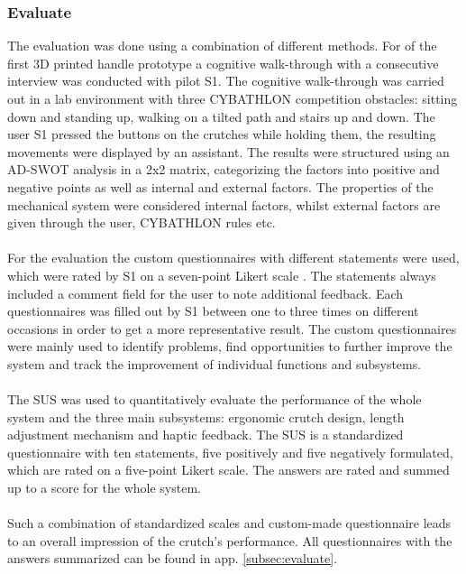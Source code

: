 \documentclass[conference,a4paper]{IEEEtran}
\begin{document}
\subsubsection{Evaluate}
The evaluation was done using a combination of different methods. For of the first 3D printed handle prototype a cognitive walk-through with a consecutive interview was conducted with pilot S1. The cognitive walk-through was carried out in a lab environment with three CYBATHLON competition obstacles: sitting down and standing up, walking on a tilted path and stairs up and down. The user S1 pressed the buttons on the crutches while holding them, the resulting movements were displayed by an assistant. The results were structured using an AD-SWOT analysis \cite{wu2009ucd} in a 2x2 matrix, categorizing the factors into positive and negative points as well as internal and external factors. The properties of the mechanical system were considered internal factors, whilst external factors are given through the user, CYBATHLON rules etc.\\
\\
For the evaluation the custom questionnaires with different statements were used, which were rated by S1 on a seven-point Likert scale \cite{likert}. The statements always included a comment field for the user to note additional feedback. Each questionnaires was filled out by S1 between one to three times on different occasions in order to get a more representative result. The custom questionnaires were mainly used to identify problems, find opportunities to further improve the system and track the improvement of individual functions and subsystems.\\
\\
The SUS \cite{brooke1996sus} was used to quantitatively evaluate the performance of the whole system and the three main subsystems: ergonomic crutch design, length adjustment mechanism and haptic feedback. The SUS is a standardized questionnaire with ten statements, five positively and five negatively formulated, which are rated on a five-point Likert scale. The answers are rated and summed up to a score for the whole system.\\
\\
Such a combination of standardized scales and custom-made questionnaire leads to an overall impression of the crutch’s performance. All questionnaires with the answers summarized can be found in app. \ref{subsec:evaluate}.
\end{document}
